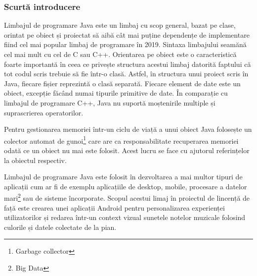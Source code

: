 \documentclass[../IoMusT.tex]{subfiles}
\begin{document}
\subsubsection{Scurtă introducere}
Limbajul de programare Java este un limbaj cu scop general, bazat pe clase, orintat pe obiect și proiectat să aibă	cât mai puține dependențe de implementare fiind cel mai popular limbaj de programare în 2019. Sintaxa limbajului seamănă cel mai mult cu cel de C sau C++. Orientarea pe obiect este o caracteristică foarte importantă în ceea ce privește structura acestui limbaj datorită faptului că tot codul scris trebuie să fie într-o clasă. Astfel, în structura unui proiect scris în Java, fiecare fișier reprezintă o clasă separată. Fiecare element de date este un obiect, excepție făcând numai tipurile primitive de date. În comparație cu limbajul de programare C++, Java nu suportă moștenirile multiple și suprascrierea operatorilor.
\\
\par Pentru gestionarea memoriei într-un ciclu de viață a unui obiect Java folosește un colector automat de gunoi\footnote{Garbage collector} care are ca responsabilitate recuperarea memoriei odată ce un obiect nu mai este folosit. Acest lucru se face cu ajutorul referințelor la obiectul respectiv.
\\
\par Limbajul de programare Java este folosit în dezvoltarea a mai multor tipuri de aplicații cum ar fi de exemplu aplicațiile de desktop, mobile, procesare a datelor mari\footnote{Big Data} sau de sisteme încorporate. Scopul acestui limaj în proiectul de lincență de față este crearea unei aplicații Android pentru personalizarea experienței utilizatorilor și redarea într-un context vizual sunetele notelor muzicale folosind culorile și datele colectate de la pian.
\end{document}
